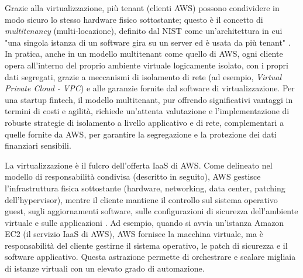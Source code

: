 Grazie alla virtualizzazione, più tenant (clienti AWS) possono condividere in modo sicuro lo stesso hardware fisico sottostante; questo è il concetto di \textit{multitenancy} (multi-locazione), definito dal NIST come un'architettura in cui "una singola istanza di un software gira su un server ed è usata da più tenant" \cite{nist800-145}. In pratica, anche in un modello multitenant come quello di AWS, ogni cliente opera all'interno del proprio ambiente virtuale logicamente isolato, con i propri dati segregati, grazie a meccanismi di isolamento di rete (ad esempio, \textit{Virtual Private Cloud - VPC}) e alle garanzie fornite dal software di virtualizzazione. Per una startup fintech, il modello multitenant, pur offrendo significativi vantaggi in termini di costi e agilità, richiede un'attenta valutazione e l'implementazione di robuste strategie di isolamento a livello applicativo e di rete, complementari a quelle fornite da AWS, per garantire la segregazione e la protezione dei dati finanziari sensibili.

La virtualizzazione è il fulcro dell'offerta IaaS di AWS. Come delineato nel modello di responsabilità condivisa (descritto in seguito), AWS gestisce l'infrastruttura fisica sottostante (hardware, networking, data center, patching dell'hypervisor), mentre il cliente mantiene il controllo sul sistema operativo guest, sugli aggiornamenti software, sulle configurazioni di sicurezza dell'ambiente virtuale e sulle applicazioni \cite{aws-well-architected}. Ad esempio, quando si avvia un'istanza Amazon EC2 (il servizio IaaS di AWS), AWS fornisce la macchina virtuale, ma è responsabilità del cliente gestirne il sistema operativo, le patch di sicurezza e il software applicativo. Questa astrazione permette di orchestrare e scalare migliaia di istanze virtuali con un elevato grado di automazione.

